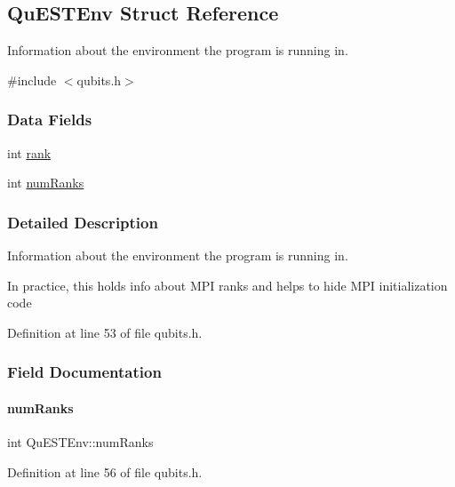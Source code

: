 \hypertarget{structQuESTEnv}{}\subsection{Qu\+E\+S\+T\+Env Struct Reference}
\label{structQuESTEnv}


Information about the environment the program is running in.  




{\ttfamily \#include $<$qubits.\+h$>$}

\subsubsection*{Data Fields}
\begin{DoxyCompactItemize}
\item 
int \hyperlink{structQuESTEnv_aa648bb336cf8598467cb62db00b9cee8}{rank}
\item 
int \hyperlink{structQuESTEnv_af22aacd7c9905accae28484785c193b4}{num\+Ranks}
\end{DoxyCompactItemize}


\subsubsection{Detailed Description}
Information about the environment the program is running in. 

In practice, this holds info about M\+PI ranks and helps to hide M\+PI initialization code 

Definition at line 53 of file qubits.\+h.



\subsubsection{Field Documentation}
\mbox{\label{structQuESTEnv_af22aacd7c9905accae28484785c193b4}} 
\paragraph{\texorpdfstring{num\+Ranks}{numRanks}}
{\footnotesize\ttfamily int Qu\+E\+S\+T\+Env\+::num\+Ranks}



Definition at line 56 of file qubits.\+h.



